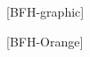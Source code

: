\documentclass[
  10pt,
  english,
]{bfhbeamer}
\subtitle{Some sub title\\Hello World}
\begin{document}
\begin{frame}[plain]
 [BFH-graphic]
 \maketitle
\end{frame}
\begin{frame}[plain]
  \maketitle
\end{frame}
\begin{frame}[plain]
  [BFH-Orange]
  \maketitle
\end{frame}
\end{document}
